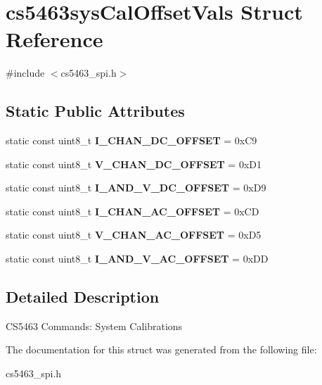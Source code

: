 \hypertarget{structcs5463sysCalOffsetVals}{\section{cs5463sys\-Cal\-Offset\-Vals Struct Reference}
\label{structcs5463sysCalOffsetVals}
}


{\ttfamily \#include $<$cs5463\-\_\-spi.\-h$>$}

\subsection*{Static Public Attributes}
\begin{DoxyCompactItemize}
\item 
\hypertarget{structcs5463sysCalOffsetVals_a1e44d7257eb422962ef39df73847b2ae}{static const uint8\-\_\-t {\bfseries I\-\_\-\-C\-H\-A\-N\-\_\-\-D\-C\-\_\-\-O\-F\-F\-S\-E\-T} = 0x\-C9}\label{structcs5463sysCalOffsetVals_a1e44d7257eb422962ef39df73847b2ae}

\item 
\hypertarget{structcs5463sysCalOffsetVals_a8efca918c7cfd211922dd61ab614809c}{static const uint8\-\_\-t {\bfseries V\-\_\-\-C\-H\-A\-N\-\_\-\-D\-C\-\_\-\-O\-F\-F\-S\-E\-T} = 0x\-D1}\label{structcs5463sysCalOffsetVals_a8efca918c7cfd211922dd61ab614809c}

\item 
\hypertarget{structcs5463sysCalOffsetVals_a16004ae7e2193b0e755eb1a3ecd220d3}{static const uint8\-\_\-t {\bfseries I\-\_\-\-A\-N\-D\-\_\-\-V\-\_\-\-D\-C\-\_\-\-O\-F\-F\-S\-E\-T} = 0x\-D9}\label{structcs5463sysCalOffsetVals_a16004ae7e2193b0e755eb1a3ecd220d3}

\item 
\hypertarget{structcs5463sysCalOffsetVals_adaad0c0f33d010b87241ac380b9c3543}{static const uint8\-\_\-t {\bfseries I\-\_\-\-C\-H\-A\-N\-\_\-\-A\-C\-\_\-\-O\-F\-F\-S\-E\-T} = 0x\-C\-D}\label{structcs5463sysCalOffsetVals_adaad0c0f33d010b87241ac380b9c3543}

\item 
\hypertarget{structcs5463sysCalOffsetVals_a0df94d3f197208610a2bb9e63f9100ee}{static const uint8\-\_\-t {\bfseries V\-\_\-\-C\-H\-A\-N\-\_\-\-A\-C\-\_\-\-O\-F\-F\-S\-E\-T} = 0x\-D5}\label{structcs5463sysCalOffsetVals_a0df94d3f197208610a2bb9e63f9100ee}

\item 
\hypertarget{structcs5463sysCalOffsetVals_a912d3d1f76e999f1632ea6a72d1af5ad}{static const uint8\-\_\-t {\bfseries I\-\_\-\-A\-N\-D\-\_\-\-V\-\_\-\-A\-C\-\_\-\-O\-F\-F\-S\-E\-T} = 0x\-D\-D}\label{structcs5463sysCalOffsetVals_a912d3d1f76e999f1632ea6a72d1af5ad}

\end{DoxyCompactItemize}


\subsection{Detailed Description}
C\-S5463 Commands\-: System Calibrations 

The documentation for this struct was generated from the following file\-:\begin{DoxyCompactItemize}
\item 
cs5463\-\_\-spi.\-h\end{DoxyCompactItemize}
